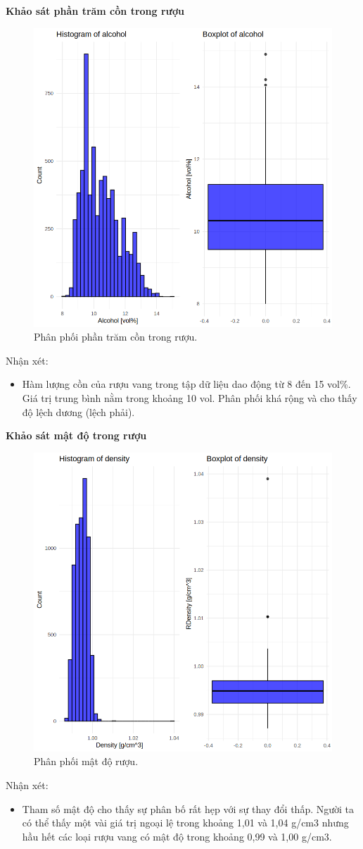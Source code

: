 \textbf{Khảo sát phần trăm cồn trong rượu}
\begin{figure}[H]
    \centering
    \includegraphics[width=0.75\columnwidth]{wine_colors/wine_alcohol.png}
    \caption{Phân phối phần trăm cồn trong rượu.}
    \label{fig:wine_alcohol}
\end{figure}
Nhận xét:
\begin{itemize}
    \item Hàm lượng cồn của rượu vang trong tập dữ liệu dao động từ 8 đến 15 vol\%. Giá trị trung bình nằm trong khoảng 10 vol. Phân phối khá rộng và cho thấy độ lệch dương (lệch phải).
\end{itemize}

\textbf{Khảo sát mật độ trong rượu}
\begin{figure}[H]
    \centering
    \includegraphics[width=0.75\columnwidth]{wine_colors/wine_density.png}
    \caption{Phân phối mật độ rượu.}
    \label{fig:wine_density}
\end{figure}
Nhận xét:
\begin{itemize}
    \item Tham số mật độ cho thấy sự phân bố rất hẹp với sự thay đổi thấp. Người ta có thể thấy một vài giá trị ngoại lệ trong khoảng 1,01 và 1,04 g/cm3 nhưng hầu hết các loại rượu vang có mật độ trong khoảng 0,99 và 1,00 g/cm3.
\end{itemize}


